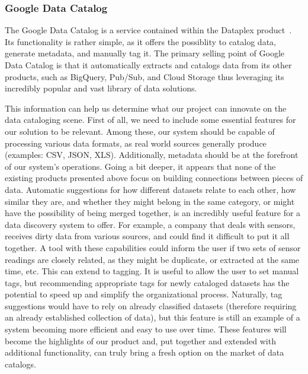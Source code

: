 \subsubsection{Google Data Catalog~\cite{GoogleDataCatalog}}
The Google Data Catalog is a service contained within the Dataplex product~\cite{GoogleDataplex}.
Its functionality is rather simple, as it offers the possiblity to catalog data, generate metadata, and manually tag it.
The primary selling point of Google Data Catalog is that it automatically extracts and catalogs data from its other
products, such as BigQuery, Pub/Sub, and Cloud Storage thus leveraging its incredibly popular and vast library of
data solutions.

\bigbreak

This information can help us determine what our project can innovate on the data cataloging scene.
First of all, we need to include some essential features for our solution to be relevant.
Among these, our system should be capable of processing various data formats, as real world sources generally produce
(examples: CSV, JSON, XLS).
Additionally, metadata should be at the forefront of our system's operations.
Going a bit deeper, it appears that none of the existing products presented above focus on building connections between
pieces of data.
Automatic suggestions for how different datasets relate to each other, how similar they are, and whether they might
belong in the same category, or might have the possibility of being merged together, is an incredibly useful feature
for a data discovery system to offer.
For example, a company that deals with sensors, receives dirty data from various sources, and could find it difficult
to put it all together.
A tool with these capabilities could inform the user if two sets of sensor readings are closely related, as they might
be duplicate, or extracted at the same time, etc.
This can extend to tagging.
It is useful to allow the user to set manual tags, but recommending appropriate tags for newly cataloged datasets has
the potential to speed up and simplify the organizational process.
Naturally, tag suggestions would have to rely on already classified datasets (therefore requiring an already established
collection of data), but this feature is still an example of a system becoming more efficient and easy to use over time.
These features will become the highlights of our product and, put together and extended with additional functionality,
can truly bring a fresh option on the market of data catalogs.